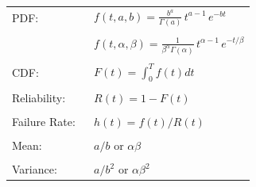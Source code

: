 \documentclass[12pt]{article}
\begin{document}
\pagestyle{empty}
\Large
{}
\pagecolor{ehandbook}

\bf
\boldmath


\begin{tabular}{ll}
PDF:                 & $\displaystyle{f(t, a, b) = \frac{b^a}{\Gamma(a)} \, t^{a-1} \, e^{-bt}}$ \\
                     & \\
                     & $\displaystyle{f(t, \alpha, \beta) = \frac{1}{\beta^{\alpha}\Gamma(\alpha)} \, t^{\alpha-1} \, e^{-t/\beta}}$ \\
                     & \\
CDF:                 & $ F(t) = \displaystyle{\int_{0}^{T}} \textstyle{f(t)dt} $ \\
                     & \\
Reliability:         & $ R(t) = 1 - F(t) $ \\
                     & \\
Failure Rate: \,\,   & $ h(t) = f(t)/R(t) $ \\
                     & \\
Mean:                & $a/b$ or $\alpha \beta$ \\
                     & \\
Variance:            & $a/b^2$ or $\alpha \beta^2$ 
\end{tabular}
 
\end{document}
